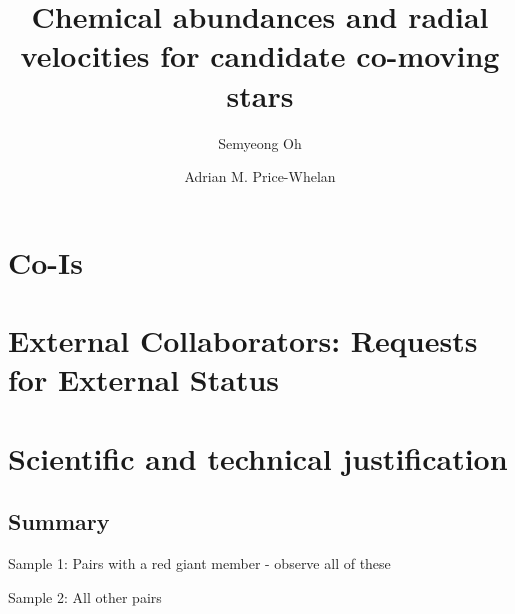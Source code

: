 \documentclass[11pt]{article}
\title{Chemical abundances and radial velocities for candidate co-moving stars}
\author[1]{Semyeong Oh}
\author[1]{Adrian M. Price-Whelan}
\affil[1]{Princeton University, USA}
\date{}
\begin{document}
\maketitle

\section*{Co-Is}

\section*{External Collaborators: Requests for External Status}

\section{Scientific and technical justification}

\subsection{Summary}

Sample 1: Pairs with a red giant member - observe all of these

Sample 2: All other pairs
\end{document}
